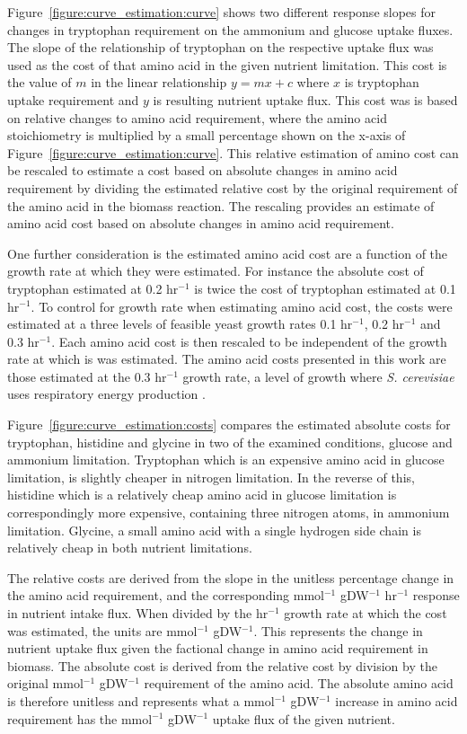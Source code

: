 Figure~\ref{figure:curve_estimation:curve} shows two different response slopes for changes in tryptophan requirement on the ammonium and glucose uptake fluxes. The slope of the relationship of tryptophan on the respective uptake flux was used as the cost of that amino acid in the given nutrient limitation. This cost is the value of $m$ in the linear relationship $y = mx + c$ where $x$ is tryptophan uptake requirement and $y$ is resulting nutrient uptake flux. This cost was is based on relative changes to amino acid requirement, where the  amino acid stoichiometry is multiplied by a small percentage shown on the x-axis of Figure~\vref{figure:curve_estimation:curve}. This relative estimation of amino cost can be rescaled to estimate a cost based on absolute changes in amino acid requirement by dividing the estimated relative cost by the original requirement of the amino acid in the biomass reaction. The rescaling provides an estimate of amino acid cost based on absolute changes in amino acid requirement.

One further consideration is the estimated amino acid cost are a function of the growth rate at which they were estimated. For instance the absolute cost of tryptophan estimated at 0.2 hr$^{-1}$ is twice the cost of tryptophan estimated at 0.1 hr$^{-1}$. To control for growth rate when estimating amino acid cost, the costs were estimated at a three levels of feasible yeast growth rates 0.1 hr$^{-1}$, 0.2 hr$^{-1}$ and 0.3 hr$^{-1}$. Each amino acid cost is then rescaled to be independent of the growth rate at which is was estimated. The amino acid costs presented in this work are those estimated at the 0.3 hr$^{-1}$ growth rate, a level of growth where \emph{S. cerevisiae} uses respiratory energy production \cite{famili2003}.

Figure~\ref{figure:curve_estimation:costs} compares the estimated absolute costs for tryptophan, histidine and glycine in two of the examined conditions, glucose and ammonium limitation. Tryptophan which is an expensive amino acid in glucose limitation, is slightly cheaper in nitrogen limitation. In the reverse of this, histidine which is a relatively cheap amino acid in glucose limitation is correspondingly more expensive, containing three nitrogen atoms, in ammonium limitation. Glycine, a small amino acid with a single hydrogen side chain is relatively cheap in both nutrient limitations.

The relative costs are derived from the slope in the unitless percentage change in the amino acid requirement, and the corresponding mmol$^{-1}$ gDW$^{-1}$ hr$^{-1}$ response in nutrient intake flux. When divided by the hr$^{-1}$ growth rate at which the cost was estimated, the units are mmol$^{-1}$ gDW$^{-1}$. This represents the change in nutrient uptake flux given the factional change in amino acid requirement in biomass. The absolute cost is derived from the relative cost by division by the original mmol$^{-1}$ gDW$^{-1}$ requirement of the amino acid. The absolute amino acid is therefore unitless and represents what a mmol$^{-1}$ gDW$^{-1}$ increase in amino acid requirement has the mmol$^{-1}$ gDW$^{-1}$ uptake flux of the given nutrient.

